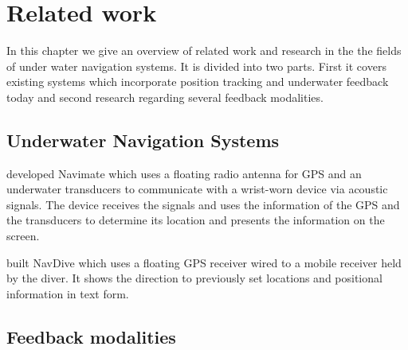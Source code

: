 %

\chapter{Related work}
\label{relatedwork}

In this chapter we give an overview of related work and research in the the fields of under water navigation systems. 
It is divided into two parts. First it covers existing systems which incorporate position tracking and underwater feedback today and second research regarding several feedback modalities. 

\section{Underwater Navigation Systems}

\cite{mckenzie} developed Navimate which uses a floating radio antenna for GPS and an underwater transducers to communicate with a wrist-worn device via acoustic signals. 
The device receives the signals and uses the information of the GPS and the transducers to determine its location and presents the information on the screen. 

\cite{Nehowig} built NavDive which uses a floating GPS receiver wired to a mobile receiver held by the diver. 
It shows the direction to previously set locations and positional information in text form. 

\section{Feedback modalities}


